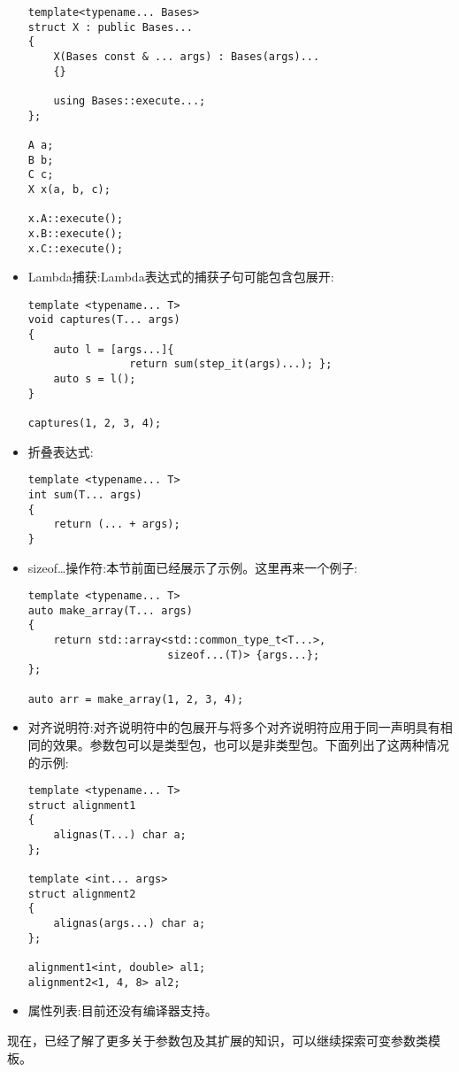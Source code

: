 \begin{itemize}
\begin{lstlisting}[style=styleCXX]
template<typename... Bases>
struct X : public Bases...
{
	X(Bases const & ... args) : Bases(args)...
	{}
	
	using Bases::execute...;
};

A a;
B b;
C c;
X x(a, b, c);

x.A::execute();
x.B::execute();
x.C::execute();
\end{lstlisting}

\item
Lambda捕获:Lambda表达式的捕获子句可能包含包展开:

\begin{lstlisting}[style=styleCXX]
template <typename... T>
void captures(T... args)
{
	auto l = [args...]{
		        return sum(step_it(args)...); };
	auto s = l();
}

captures(1, 2, 3, 4);
\end{lstlisting}

\item
折叠表达式:

\begin{lstlisting}[style=styleCXX]
template <typename... T>
int sum(T... args)
{
	return (... + args);
}
\end{lstlisting}

\item
sizeof…操作符:本节前面已经展示了示例。这里再来一个例子:

\begin{lstlisting}[style=styleCXX]
template <typename... T>
auto make_array(T... args)
{
	return std::array<std::common_type_t<T...>,
	                  sizeof...(T)> {args...};
};

auto arr = make_array(1, 2, 3, 4);
\end{lstlisting}

\item
对齐说明符:对齐说明符中的包展开与将多个对齐说明符应用于同一声明具有相同的效果。参数包可以是类型包，也可以是非类型包。下面列出了这两种情况的示例:

\begin{lstlisting}[style=styleCXX]
template <typename... T>
struct alignment1
{
	alignas(T...) char a;
};

template <int... args>
struct alignment2
{
	alignas(args...) char a;
};

alignment1<int, double> al1;
alignment2<1, 4, 8> al2;
\end{lstlisting}

\item
属性列表:目前还没有编译器支持。
\end{itemize}

现在，已经了解了更多关于参数包及其扩展的知识，可以继续探索可变参数类模板。








